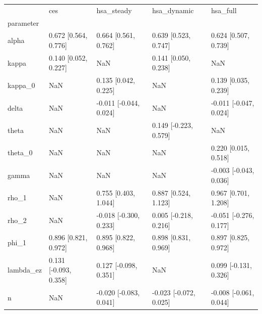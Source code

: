 \begin{tabular}{lllll}
\toprule
 & ces & hsa\_steady & hsa\_dynamic & hsa\_full \\
parameter &  &  &  &  \\
\midrule
alpha & 0.672 [0.564, 0.776] & 0.664 [0.561, 0.762] & 0.639 [0.523, 0.747] & 0.624 [0.507, 0.739] \\
kappa & 0.140 [0.052, 0.227] & NaN & 0.141 [0.050, 0.238] & NaN \\
kappa\_0 & NaN & 0.135 [0.042, 0.225] & NaN & 0.139 [0.035, 0.239] \\
delta & NaN & -0.011 [-0.044, 0.024] & NaN & -0.011 [-0.047, 0.024] \\
theta & NaN & NaN & 0.149 [-0.223, 0.579] & NaN \\
theta\_0 & NaN & NaN & NaN & 0.220 [0.015, 0.518] \\
gamma & NaN & NaN & NaN & -0.003 [-0.043, 0.036] \\
rho\_1 & NaN & 0.755 [0.403, 1.044] & 0.887 [0.524, 1.123] & 0.967 [0.701, 1.208] \\
rho\_2 & NaN & -0.018 [-0.300, 0.233] & 0.005 [-0.218, 0.216] & -0.051 [-0.276, 0.177] \\
phi\_1 & 0.896 [0.821, 0.972] & 0.895 [0.822, 0.968] & 0.898 [0.831, 0.969] & 0.897 [0.825, 0.972] \\
lambda\_ez & 0.131 [-0.093, 0.358] & 0.127 [-0.098, 0.351] & NaN & 0.099 [-0.131, 0.326] \\
n & NaN & -0.020 [-0.083, 0.041] & -0.023 [-0.072, 0.025] & -0.008 [-0.061, 0.044] \\
\bottomrule
\end{tabular}
